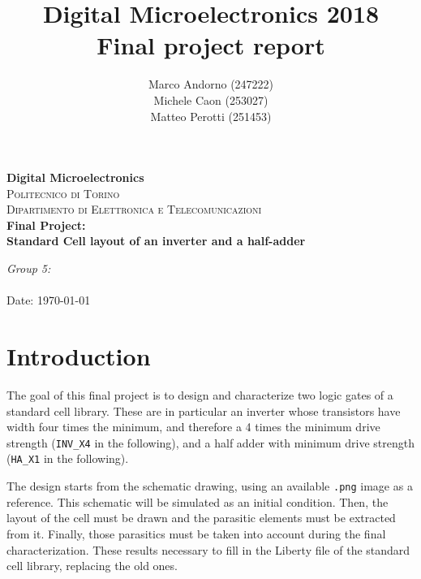 \documentclass[a4paper]{article}
\title{Digital Microelectronics 2018 \\ Final project report}
\author{Marco Andorno (247222)\\ Michele Caon (253027) \\ Matteo Perotti (251453)}
\newcommand{\inv}{\texttt{INV\_X4}\xspace}
\newcommand{\ha}{\texttt{HA\_X1}\xspace}
\begin{document}
\begin{center}

\thispagestyle{empty}

\textbf{\Large Digital Microelectronics}\\[1.0cm]
\textsc{\Large Politecnico di Torino}\\[0.5cm]
\textsc{\large Dipartimento di Elettronica e Telecomunicazioni}\\[1cm]

\huge \textbf{Final Project: \\}
\huge \textbf{Standard Cell layout of an inverter and a half-adder}

\end{center}

\vfill
\large
\begin{flushleft}
\makeatletter
\emph{Group 5:}\\
\@author \\
\vspace{1cm}
\normalsize Date: \today
\makeatother
\end{flushleft}


\newpage

\pagestyle{fancy}
\lhead{}
\chead{}
\rhead{\leftmark}
\lfoot{\thepage}
\cfoot{}
\rfoot{}
\renewcommand{\headrulewidth}{0.3pt}
\renewcommand{\footrulewidth}{0.3pt}


\section{Introduction}
\label{sec:intro}
The goal of this final project is to design and characterize two logic gates of a standard cell library. These are in particular an inverter whose transistors have width four times the minimum, and therefore a 4 times the minimum drive strength (\inv in the following), and a half adder with minimum drive strength (\ha in the following).

The design starts from the schematic drawing, using an available \texttt{.png} image as a reference. This schematic will be simulated as an initial condition. Then, the layout of the cell must be drawn and the parasitic elements must be extracted from it. Finally, those parasitics must be taken into account during the final characterization. These results necessary to fill in the Liberty file of the standard cell library, replacing the old ones.
\end{document}
